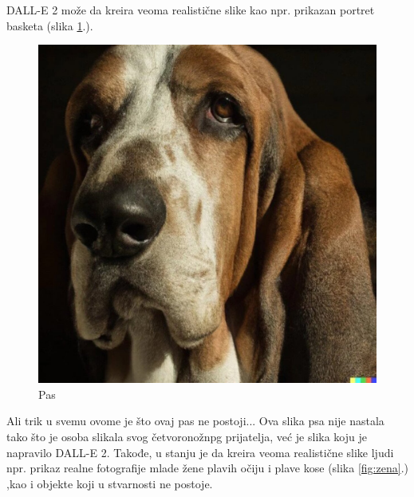 \documentclass[a4paper]{article}
\begin{document}
DALL-E 2 može da kreira veoma realistične slike kao npr. prikazan  portret basketa (slika \ref{fig:pas}.).
\begin{nesto1}
\begin{figure}[h!]
\begin{center}
\includegraphics[scale=0.09]{pas.jpg}
\end{center}
\caption{Pas}
\label{fig:pas}
\end{figure}

Ali trik u svemu ovome je što ovaj pas ne postoji... Ova slika psa nije nastala tako što je osoba slikala svog četvoronožnpg prijatelja, već je slika koju je napravilo DALL-E 2. Takođe, u stanju je da kreira veoma realistične slike ljudi npr. prikaz  realne fotografije mlade žene plavih očiju i plave kose (slika \ref{fig:zena}.) ,kao i objekte koji u stvarnosti ne postoje.


\end{nesto1}
\end{document}
